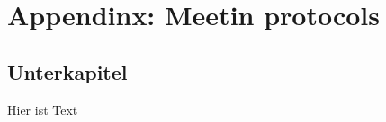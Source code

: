 \appendix
\chapter{Appendinx: Meetin protocols} \label{sec:appendix}
\section{Unterkapitel}
Hier ist Text